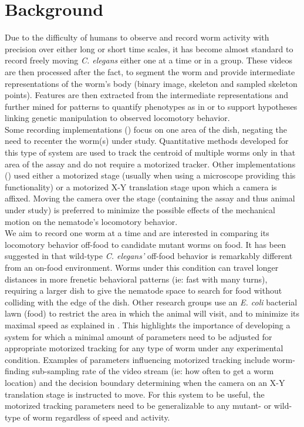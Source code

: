 \documentclass[main.tex]{subfiles}
\begin{document}
\section{Background}
Due to the difficulty of humans to observe and record worm activity with precision over either long or short time scales, it has become almost standard to record freely moving \textit{C. elegans} either one at a time or in a group. These videos are then processed after the fact, to segment the worm and provide intermediate representations of the worm's body (binary image, skeleton and sampled skeleton points). Features are then extracted from the intermediate representations and further mined for patterns to quantify phenotypes as in \cite{yemini2013} or to support hypotheses linking genetic manipulation to observed locomotory behavior.\\ %

Some recording implementations (\cite{ramot2008, tsibidis2007}) focus on one area of the dish, negating the need to recenter the worm(s) under study. Quantitative methods developed for this type of system are used to track the centroid of multiple worms only in that area of the assay and do not require a motorized tracker. Other implementations (\cite{feng2004}) used either a motorized stage (usually when using a microscope providing this functionality) or a motorized X-Y translation stage upon which a camera is affixed. Moving the camera over the stage (containing the assay and thus animal under study) is preferred to minimize the possible effects of the mechanical motion on the nematode's locomotory behavior. \\

We aim to record one worm at a time and are interested in comparing its locomotory behavior off-food to candidate mutant worms on food. It has been suggested in \cite{gray2005} that wild-type \textit{C. elegans'} off-food behavior is remarkably different from an on-food environment. Worms under this condition can travel longer distances in more frenetic behavioral patterns (ie: fast with many turns), requiring a larger dish to give the nematode space to search for food without colliding with the edge of the dish. Other research groups use an \textit{E. coli} bacterial lawn (food) to restrict the area in which the animal will visit, and to minimize its maximal speed as explained in \cite{geng2004}. This highlights the importance of developing a system for which a minimal amount of parameters need to be adjusted for appropriate motorized tracking for any type of worm under any experimental condition. Examples of parameters influencing motorized tracking include worm-finding sub-sampling rate of the video stream (ie: how often to get a worm location) and the decision boundary determining when the camera on an X-Y translation stage is instructed to move. For this system to be useful, the motorized tracking parameters need to be generalizable to any mutant- or wild-type of worm regardless of speed and activity. \\
\end{document}
